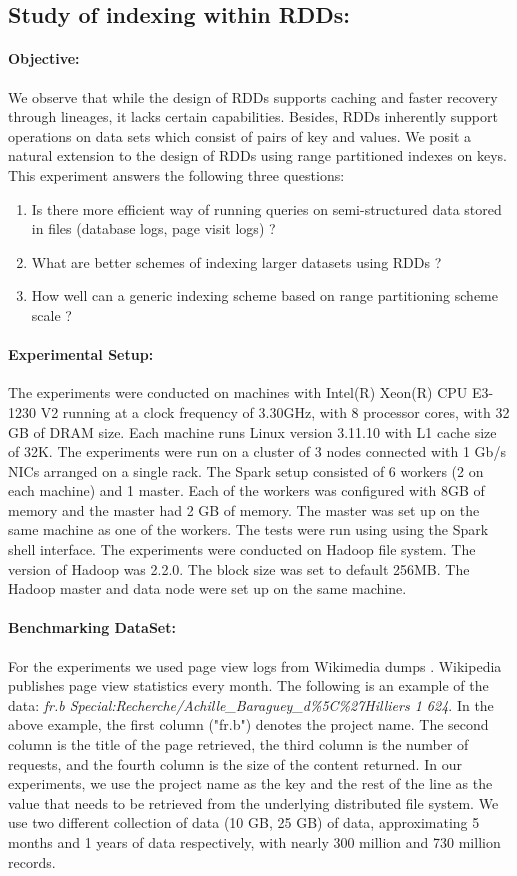 \subsection{Study of indexing within RDDs:}
\paragraph{Objective:} We observe that while the design of RDDs supports caching and faster recovery through lineages, it lacks certain capabilities. Besides, RDDs inherently support operations on data sets which consist of pairs of key and values. We posit a natural extension to the design of RDDs using range partitioned indexes on keys. This experiment answers the following three questions:
\begin{enumerate}
\item Is there more efficient way of running queries on semi-structured data stored in files (database logs, page visit logs) ? 
\item What are better schemes of indexing larger datasets using  RDDs ?
\item How well can a generic indexing scheme based on range partitioning scheme scale ? 
\end{enumerate}
\paragraph{Experimental Setup:} The experiments were conducted on machines with Intel(R) Xeon(R) CPU E3-1230 V2 running at a clock frequency of 3.30GHz, with 8 processor cores, with 32 GB of DRAM size. Each machine runs Linux version 3.11.10 with L1 cache size of 32K.  The experiments were run on a cluster of 3 nodes connected with 1 Gb/s NICs arranged on a single rack. The Spark setup consisted of 6 workers (2 on each machine) and 1 master. Each of the workers was configured with 8GB of memory and the master had 2 GB of memory.  The master was set up on the same machine as one of the workers. The tests were run using using the Spark shell interface.  The experiments were conducted on Hadoop file system. The version of Hadoop was 2.2.0.  The block size was set to default 256MB. The Hadoop master and data node were set up on the same machine.

\paragraph{Benchmarking DataSet:} For the experiments we used page view logs from Wikimedia dumps \cite{wikimedia}. Wikipedia publishes page view statistics every month. The following is an example of the data:  \textit{fr.b Special:Recherche/Achille\_Baraguey\_d\%5C\%27Hilliers 1 624}. In the above example, the first column ("fr.b") denotes the project name. The second column is the title of the page retrieved, the third column is the number of requests, and the fourth column is the size of the content returned.  In our experiments, we use the project name as the key and the rest of the line as the value that needs to be retrieved from the underlying distributed file system.  We use two different collection of data (10 GB, 25 GB) of data, approximating 5 months and 1 years of data respectively, with nearly 300 million and 730 million records. 

